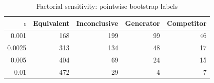 \begin{table}[htbp]
\centering
\caption{Factorial sensitivity: pointwise bootstrap labels}
\label{tab:m02-robustness-epsilon}
\begin{tabular}{rrrrr}
\toprule
$\epsilon$ & Equivalent & Inconclusive & Generator & Competitor \\
\midrule
0.001 & 168 & 199 & 99 & 46 \\
0.0025 & 313 & 134 & 48 & 17 \\
0.005 & 404 & 69 & 24 & 15 \\
0.01 & 472 & 29 & 4 & 7 \\
\bottomrule
\end{tabular}
\end{table}
